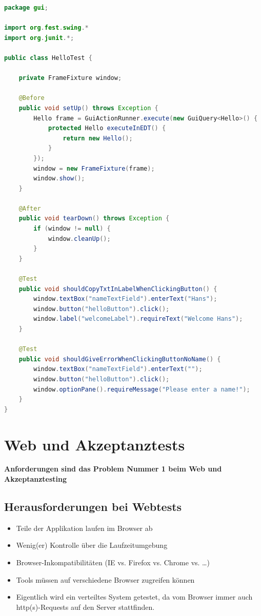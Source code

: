 \documentclass[a4paper,10pt]{article}
\newcommand{\Bold}[1]{\textbf{#1}} %
\begin{document}
\begin{lstlisting}[language=Java,caption=FEST Beispiel 1.b, style=MyJavaStyle]
package gui;

import org.fest.swing.*
import org.junit.*;

public class HelloTest {

    private FrameFixture window;

    @Before
    public void setUp() throws Exception {
        Hello frame = GuiActionRunner.execute(new GuiQuery<Hello>() {
            protected Hello executeInEDT() {
                return new Hello();
            }
        });
        window = new FrameFixture(frame);
        window.show();
    }

    @After
    public void tearDown() throws Exception {
        if (window != null) {
            window.cleanUp();
        }
    }

    @Test
    public void shouldCopyTxtInLabelWhenClickingButton() {
        window.textBox("nameTextField").enterText("Hans");
        window.button("helloButton").click();
        window.label("welcomeLabel").requireText("Welcome Hans");
    }
    
    @Test
    public void shouldGiveErrorWhenClickingButtonNoName() {
        window.textBox("nameTextField").enterText("");
        window.button("helloButton").click();
        window.optionPane().requireMessage("Please enter a name!");
    }
}
\end{lstlisting}
\pagebreak
\section{Web und Akzeptanztests}
\textbf{\Bold Anforderungen sind das Problem Nummer 1 beim Web und Akzeptanztesting}\\
\subsection{Herausforderungen bei Webtests}
\begin{itemize}
\item Teile der Applikation laufen im Browser ab
\item Wenig(er) Kontrolle über die Laufzeitumgebung
\item Browser-Inkompatibilit\"aten (IE vs. Firefox vs. Chrome vs. …)
\item Tools müssen auf verschiedene Browser zugreifen k\"onnen
\item Eigentlich wird ein verteiltes System getestet, da vom Browser immer auch http(s)-Requests auf den Server stattfinden.
\end{itemize}
\end{document}
